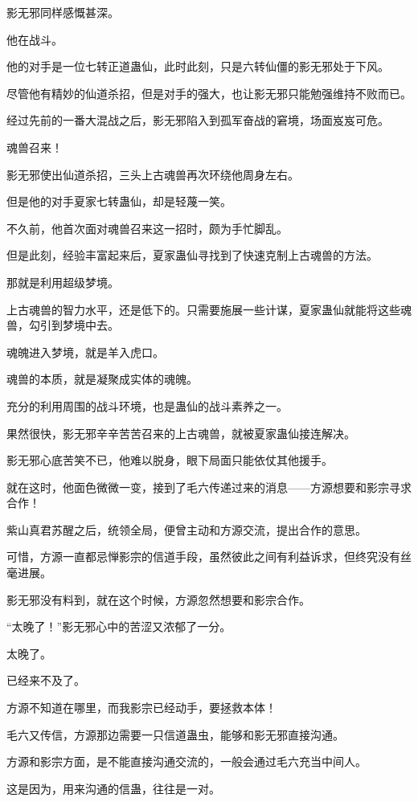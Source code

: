 \begin{this_body}
影无邪同样感慨甚深。

他在战斗。

他的对手是一位七转正道蛊仙，此时此刻，只是六转仙僵的影无邪处于下风。

尽管他有精妙的仙道杀招，但是对手的强大，也让影无邪只能勉强维持不败而已。

经过先前的一番大混战之后，影无邪陷入到孤军奋战的窘境，场面岌岌可危。

魂兽召来！

影无邪使出仙道杀招，三头上古魂兽再次环绕他周身左右。

但是他的对手夏家七转蛊仙，却是轻蔑一笑。

不久前，他首次面对魂兽召来这一招时，颇为手忙脚乱。

但是此刻，经验丰富起来后，夏家蛊仙寻找到了快速克制上古魂兽的方法。

那就是利用超级梦境。

上古魂兽的智力水平，还是低下的。只需要施展一些计谋，夏家蛊仙就能将这些魂兽，勾引到梦境中去。

魂魄进入梦境，就是羊入虎口。

魂兽的本质，就是凝聚成实体的魂魄。

充分的利用周围的战斗环境，也是蛊仙的战斗素养之一。

果然很快，影无邪辛辛苦苦召来的上古魂兽，就被夏家蛊仙接连解决。

影无邪心底苦笑不已，他难以脱身，眼下局面只能依仗其他援手。

就在这时，他面色微微一变，接到了毛六传递过来的消息——方源想要和影宗寻求合作！

紫山真君苏醒之后，统领全局，便曾主动和方源交流，提出合作的意思。

可惜，方源一直都忌惮影宗的信道手段，虽然彼此之间有利益诉求，但终究没有丝毫进展。

影无邪没有料到，就在这个时候，方源忽然想要和影宗合作。

“太晚了！”影无邪心中的苦涩又浓郁了一分。

太晚了。

已经来不及了。

方源不知道在哪里，而我影宗已经动手，要拯救本体！

毛六又传信，方源那边需要一只信道蛊虫，能够和影无邪直接沟通。

方源和影宗方面，是不能直接沟通交流的，一般会通过毛六充当中间人。

这是因为，用来沟通的信蛊，往往是一对。


\end{this_body}
